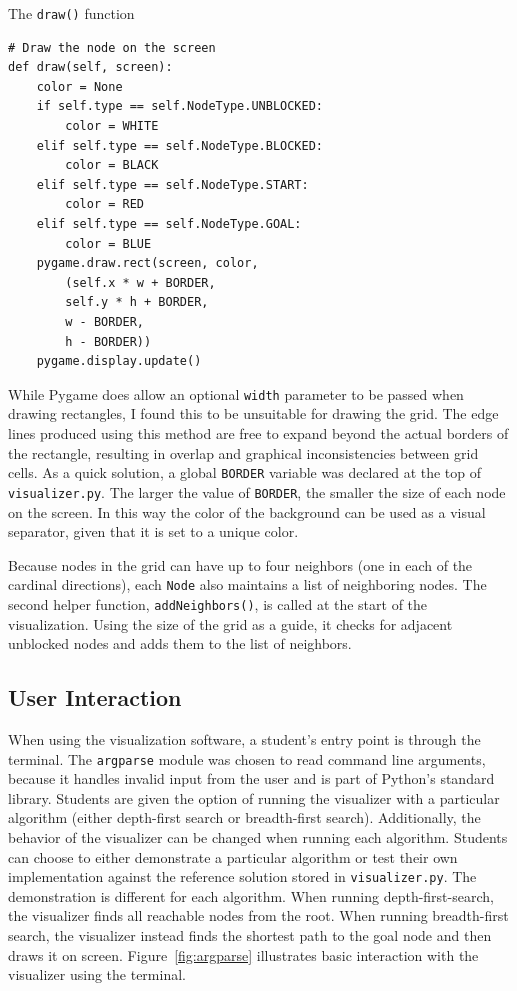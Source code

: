 \documentclass[pageno]{jpaper}
\begin{document}
\begin{listing}[hbt]
\centering
\begin{minipage}{0.8\textwidth}%
\linespread{1.0}
\caption{The \texttt{draw()} function}
\begin{verbatim}
# Draw the node on the screen
def draw(self, screen):
	color = None
	if self.type == self.NodeType.UNBLOCKED:
		color = WHITE
	elif self.type == self.NodeType.BLOCKED:
		color = BLACK
	elif self.type == self.NodeType.START:
		color = RED
	elif self.type == self.NodeType.GOAL:
		color = BLUE
	pygame.draw.rect(screen, color, 
		(self.x * w + BORDER, 
		self.y * h + BORDER, 
		w - BORDER, 
		h - BORDER))
	pygame.display.update()
\end{verbatim}
\label{lst:draw}
\end{minipage}
\end{listing}

While Pygame does allow an optional \texttt{width} parameter to be passed when drawing rectangles, I found this to be unsuitable for drawing the grid. The edge lines produced using this method are free to expand beyond the actual borders of the rectangle, resulting in overlap and graphical inconsistencies between grid cells. As a quick solution, a global \texttt{BORDER} variable was declared at the top of \texttt{visualizer.py}. The larger the value of \texttt{BORDER}, the smaller the size of each node on the screen. In this way the color of the background can be used as a visual separator, given that it is set to a unique color.

Because nodes in the grid can have up to four neighbors (one in each of the cardinal directions), each \texttt{Node} also maintains a list of neighboring nodes. The second helper function, \texttt{addNeighbors()}, is called at the start of the visualization. Using the size of the grid as a guide, it checks for adjacent unblocked nodes and adds them to the list of neighbors.

\subsection{User Interaction}

When using the visualization software, a student's entry point is through the terminal. The \texttt{argparse} module was chosen to read command line arguments, because it handles invalid input from the user and is part of Python's standard library. Students are given the option of running the visualizer with a particular algorithm (either depth-first search or breadth-first search). Additionally, the behavior of the visualizer can be changed when running each algorithm. Students can choose to either demonstrate a particular algorithm or test their own implementation against the reference solution stored in \texttt{visualizer.py}. The demonstration is different for each algorithm. When running depth-first-search, the visualizer finds all reachable nodes from the root. When running breadth-first search, the visualizer instead finds the shortest path to the goal node and then draws it on screen. Figure~\ref{fig:argparse} illustrates basic interaction with the visualizer using the terminal.
\end{document}
